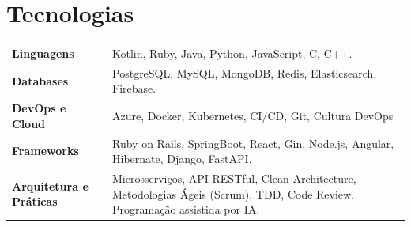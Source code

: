 \documentclass[a4paper,10.5pt]{article}
\begin{document}

\section{Tecnologias}
\begin{tabularx}{\linewidth}{@{}l X@{}}

\textbf{Linguagens} &  \normalsize{Kotlin, Ruby, Java, Python, JavaScript, C, C++.}\\

\textbf{Databases} &  \normalsize{PostgreSQL, MySQL, MongoDB, Redis, Elasticsearch, Firebase.}\\

\textbf{DevOps e Cloud} &  \normalsize{Azure, Docker, Kubernetes, CI/CD, Git, Cultura DevOps}\\


\textbf{Frameworks} &  \normalsize{Ruby on Rails, SpringBoot, React, Gin, Node.js, Angular, Hibernate, Django, FastAPI.}\\

\textbf{Arquitetura e Práticas} &  \normalsize{Microsserviços, API RESTful, Clean Architecture, Metodologias Ágeis (Scrum), TDD, Code Review, Programação assistida por IA.}\\


\end{tabularx}

\vfill
{}
\end{document}
